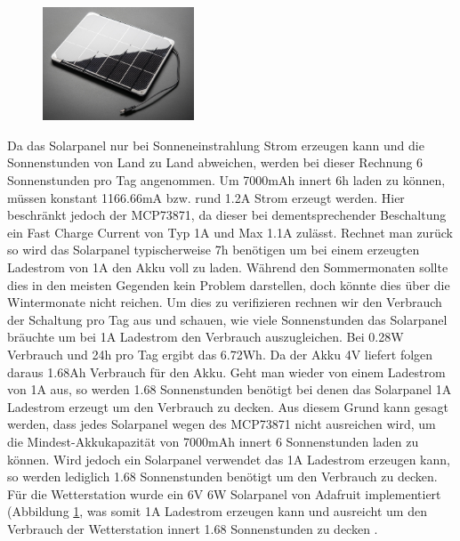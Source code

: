 \begin{figure}[h]
\centering
\includegraphics[width=0.4\textwidth]{graphics/Energieversorgung/Solarpanel.JPG}
\label{fig:Solarpanel}
\end{figure}
\newpage
Da das Solarpanel nur bei Sonneneinstrahlung Strom erzeugen kann und die Sonnenstunden von Land zu Land abweichen, werden bei dieser Rechnung 6 Sonnenstunden pro Tag angenommen. Um 7000mAh innert 6h laden zu können, müssen konstant 1166.66mA bzw. rund 1.2A Strom erzeugt werden. Hier beschränkt jedoch der MCP73871, da dieser bei dementsprechender Beschaltung ein Fast Charge Current von Typ 1A und Max 1.1A zulässt. Rechnet man zurück so wird das Solarpanel typischerweise 7h benötigen um bei einem erzeugten Ladestrom von 1A den Akku voll zu laden. Während den Sommermonaten sollte dies in den meisten Gegenden kein Problem darstellen, doch könnte dies über die Wintermonate nicht reichen. Um dies zu verifizieren rechnen wir den Verbrauch der Schaltung pro Tag aus und schauen, wie viele Sonnenstunden das Solarpanel bräuchte um bei 1A Ladestrom den Verbrauch auszugleichen. Bei 0.28W Verbrauch und 24h pro Tag ergibt das 6.72Wh. Da der Akku 4V liefert folgen daraus 1.68Ah Verbrauch für den Akku. Geht man wieder von einem Ladestrom von 1A aus, so werden 1.68 Sonnenstunden benötigt bei denen das Solarpanel 1A Ladestrom erzeugt um den Verbrauch zu decken. Aus diesem Grund kann gesagt werden, dass jedes Solarpanel wegen des MCP73871 nicht ausreichen wird, um die Mindest-Akkukapazität von 7000mAh innert 6 Sonnenstunden laden zu können. Wird jedoch ein Solarpanel verwendet das 1A Ladestrom erzeugen kann, so werden lediglich 1.68 Sonnenstunden benötigt um den Verbrauch zu decken. Für die Wetterstation wurde ein 6V 6W Solarpanel von Adafruit implementiert (Abbildung \ref{fig:Solarpanel}, was somit 1A Ladestrom erzeugen kann und ausreicht um den Verbrauch der Wetterstation innert 1.68 Sonnenstunden zu decken \cite{Solarpanel}.\\


